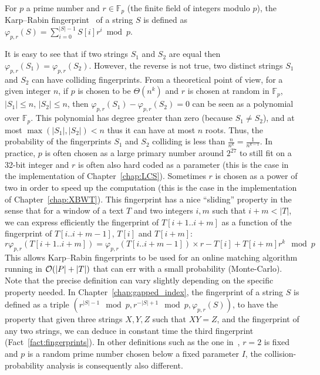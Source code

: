 For $p$ a prime number and $r \in \mathbb{F}_p$ (the finite field of integers modulo $p$), the Karp--Rabin fingerprint~\cite{DBLP:journals/ibmrd/KarpR87} of a string $S$ is defined as
$\varphi_{p,r}(S) = \sum_{i = 0}^{|S|-1}  S[i]r^{i} \bmod p$.

It is easy to see that if two strings $S_1$ and $S_2$ are equal then $\varphi_{p,r}(S_1) = \varphi_{p,r}(S_2)$. However, the reverse is not true, two distinct strings $S_1$ and $S_2$ can have colliding fingerprints.
From a theoretical point of view, for a given integer $n$, if $p$ is chosen to be $\Theta(n^k)$ and $r$ is chosen at random in $\mathbb{F}_p$, $|S_1|\leq n$, $|S_2|\leq n$, then $\varphi_{p,r}(S_1) - \varphi_{p,r}(S_2) = 0$ can be seen as a polynomial over $\mathbb{F}_p$. This polynomial has degree greater than zero (because $S_1 \neq S_2$), and at most $\max(|S_1|,|S_2|) < n$ thus it can have at most $n$ roots. Thus, the probability of the fingerprints $S_1$ and $S_2$ colliding is less than $\frac{n}{n^k} = \frac{1}{n^{k-1}}$.
In practice, $p$ is often chosen as a large primary number around $2^{27}$ to still fit on a 32-bit integer and $r$ is often also hard coded as a parameter (this is the case in the implementation of Chapter~\ref{chap:LCS}). Sometimes $r$ is chosen as a power of two in order to speed up the computation (this is the case in the implementation of Chapter~\ref{chap:XBWT}).
%
This fingerprint has a nice ``sliding'' property in the sense that for a window of a text $T$ and two integers $i,m$ such that $i+m < |T|$, we can express efficiently the fingerprint of $T[i+1..i+m]$ as a function of the fingerprint of $T[i..i+m-1]$, $T[i]$ and $T[i+m]$:
$$ r \varphi_{p,r}(T[i+1..i+m]) = \varphi_{p,r}(T[i..i+m-1])\times r - T[i] + T[i+m]r^k \mod p$$
This allows Karp--Rabin fingerprints to be used for an online matching algorithm running in $\mathcal{O}(|P|+|T|)$ that can err with a small probability (Monte-Carlo).
Note that the precise definition can vary slightly depending on the specific property needed. In Chapter~\ref{chap:gapped_index}, the fingerprint of a string $S$ is defined as a triple $(r^{|S|-1} \mod p, r^{-|S|+1} \mod p, \varphi_{p,r}(S))$, to have the property that given three strings $X,Y,Z$ such that $XY =Z$, and the fingerprint of any two strings, we can deduce in constant time the third fingerprint (Fact~\ref{fact:fingerprints}). In other definitions such as the one in~\cite{Gusfield1997}, $r=2$ is fixed and $p$ is a random prime number chosen below a fixed parameter $I$, the collision-probability  analysis is consequently also different.

